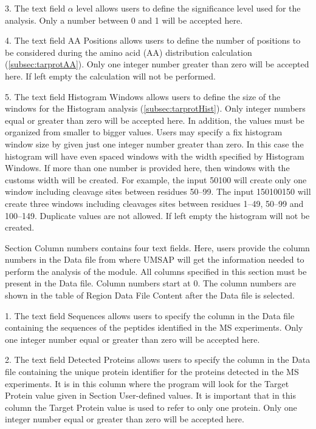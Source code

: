 \num{3}. The text field $\alpha$ level allows users to define the significance level
used for the analysis. Only a number between \num{0} and \num{1} will be accepted
here.

\num{4}. The text field AA Positions\label{par:tarprotPos} allows users to define
the number of positions to be considered during the amino acid (AA) distribution
calculation (\autoref{subsec:tarprotAA}). Only one integer number greater than zero
will be accepted here. If left empty the calculation will not be performed.

\num{5}. The text field Histogram Windows\label{par:tarprotHist} allows users to
define the size of the windows for the Histogram analysis (\autoref{subsec:tarprotHist}).
Only integer numbers equal or greater than zero will be accepted here. In addition,
the values must be organized from smaller to bigger values. Users may specify a fix
histogram window size by given just one integer number greater than zero. In this
case the histogram will have even spaced windows with the width specified by Histogram
Windows. If more than one number is provided here, then windows with the customs width
will be created. For example, the input \numlist{50 100} will create only one window
including cleavage sites between residues \numrange{50}{99}. The input
\numlist{1 50 100 150} will create three windows including cleavages sites between
residues \numrange{1}{49}, \numrange{50}{99} and \numrange{100}{149}. Duplicate values
are not allowed. If left empty the histogram will not be created.

Section Column numbers contains four text fields. Here, users provide the column
numbers in the Data file from where UMSAP will get the information needed to perform
the analysis of the module. All columns specified in this section must be present
in the Data file. Column numbers start at \num{0}. The column numbers are shown in
the table of Region Data File Content after the Data file is selected.

\num{1}. The text field Sequences allows users to specify the column in the Data
file containing the sequences of the peptides identified in the MS experiments.
Only one integer number equal or greater than zero will be accepted here.

\num{2}. The text field Detected Proteins allows users to specify the column in
the Data file containing the unique protein identifier for the proteins detected
in the MS experiments. It is in this column where the program will look for the
Target Protein value given in Section User-defined values. It is important that
in this column the Target Protein value is used to refer to only one protein. Only
one integer number equal or greater than zero will be accepted here.

